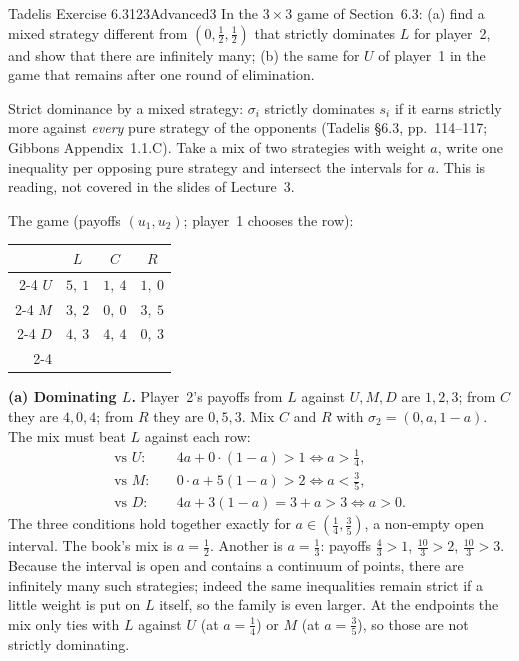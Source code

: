 \begin{exsol}{Tadelis Exercise 6.3}{123}{Advanced}{3}
\asked In the $3\times3$ game of Section~6.3: (a) find a mixed strategy different from
$(0,\frac12,\frac12)$ that strictly dominates $L$ for player~2, and show that there are infinitely many;
(b) the same for $U$ of player~1 in the game that remains after one round of elimination.

\method Strict dominance by a mixed strategy: $\sigma_i$ strictly dominates $s_i$ if it earns strictly
more against \emph{every} pure strategy of the opponents (Tadelis \S6.3, pp.~114--117;
Gibbons Appendix~1.1.C). Take a mix of two strategies with weight $a$, write one inequality per
opposing pure strategy and intersect the intervals for $a$. This is reading, not covered in the slides
of Lecture~3.

\solution
The game (payoffs $(u_1,u_2)$; player~1 chooses the row):
\begin{center}
\begin{tabular}{r|c|c|c|}
\multicolumn{1}{r}{} & \multicolumn{1}{c}{$L$} & \multicolumn{1}{c}{$C$} & \multicolumn{1}{c}{$R$}\\ \cline{2-4}
$U$ & $5,\ 1$ & $1,\ 4$ & $1,\ 0$ \\ \cline{2-4}
$M$ & $3,\ 2$ & $0,\ 0$ & $3,\ 5$ \\ \cline{2-4}
$D$ & $4,\ 3$ & $4,\ 4$ & $0,\ 3$ \\ \cline{2-4}
\end{tabular}
\end{center}

\textbf{(a) Dominating $L$.} Player~2's payoffs from $L$ against $U, M, D$ are $1, 2, 3$; from $C$ they
are $4, 0, 4$; from $R$ they are $0, 5, 3$. Mix $C$ and $R$ with $\sigma_2 = (0, a, 1-a)$. The mix must
beat $L$ against each row:
\begin{align*}
  \text{vs } U:&\quad 4a + 0\cdot(1-a) > 1 \iff a > \tfrac14,\\
  \text{vs } M:&\quad 0\cdot a + 5(1-a) > 2 \iff a < \tfrac35,\\
  \text{vs } D:&\quad 4a + 3(1-a) = 3 + a > 3 \iff a > 0 .
\end{align*}
The three conditions hold together exactly for $a \in (\frac14, \frac35)$, a non-empty open interval.
The book's mix is $a = \frac12$. Another is $a = \frac13$: payoffs $\frac43 > 1$, $\frac{10}{3} > 2$,
$\frac{10}3 > 3$. Because the interval is open and contains a continuum of points, there are
infinitely many such strategies; indeed the same inequalities remain strict if a little weight is put on
$L$ itself, so the family is even larger. At the endpoints the mix only ties with $L$ against $U$ (at
$a = \frac14$) or $M$ (at $a = \frac35$), so those are not strictly dominating.


\end{exsol}
